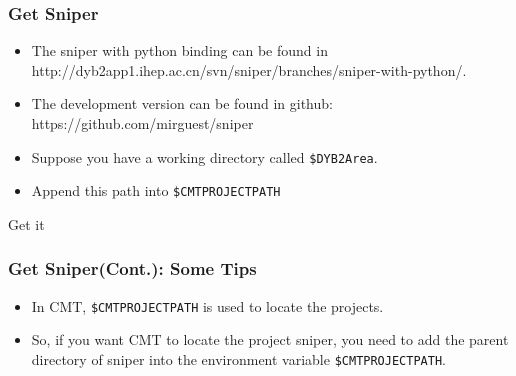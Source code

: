 \begin{frame}
    \frametitle{Get Sniper}
    \begin{itemize}
        \item The sniper with python binding can be found
                in http://dyb2app1.ihep.ac.cn/svn/sniper/branches/sniper-with-python/.
        \item The development version can be found in github:
                https://github.com/mirguest/sniper
        \item Suppose you have a working directory 
                called {\tt \$DYB2Area}.
        \item Append this path into {\tt \$CMTPROJECTPATH}
    \end{itemize}
    \begin{block}{Get it}
        \par\usebox{\getsniper}
    \end{block}
\end{frame}

\begin{frame}
    \frametitle{Get Sniper(Cont.): Some Tips}
    \begin{itemize}
        \item In CMT, {\tt \$CMTPROJECTPATH}
                is used to locate the projects.
        \item So, if you want CMT to locate the 
                project sniper, you need to add the 
                parent directory of sniper into 
                the environment variable {\tt \$CMTPROJECTPATH}.

    \end{itemize}
\end{frame}
